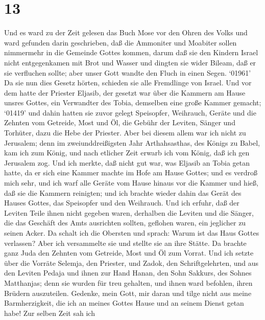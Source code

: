 \hypertarget{section-12}{%
\section{13}\label{section-12}}

 Und es ward zu der Zeit gelesen das Buch Mose vor den Ohren
des Volks und ward gefunden darin geschrieben, daß die Ammoniter und
Moabiter sollen nimmermehr in die Gemeinde Gottes kommen, 
darum daß sie den Kindern Israel nicht entgegenkamen mit Brot und Wasser
und dingten sie wider Bileam, daß er sie verfluchen sollte; aber unser
Gott wandte den Fluch in einen Segen.  `01961' Da sie nun
dies Gesetz hörten, schieden sie alle Fremdlinge von Israel.
 Und vor dem hatte der Priester Eljasib, der gesetzt war
über die Kammern am Hause unsres Gottes, ein Verwandter des Tobia,
demselben eine große Kammer gemacht;  `01419' und dahin
hatten sie zuvor gelegt Speisopfer, Weihrauch, Geräte und die Zehnten
vom Getreide, Most und Öl, die Gebühr der Leviten, Sänger und Torhüter,
dazu die Hebe der Priester.  Aber bei diesem allem war ich
nicht zu Jerusalem; denn im zweiunddreißigsten Jahr Arthahsasthas, des
Königs zu Babel, kam ich zum König, und nach etlicher Zeit erwarb ich
vom König,  daß ich gen Jerusalem zog. Und ich merkte, daß
nicht gut war, was Eljasib an Tobia getan hatte, da er sich eine Kammer
machte im Hofe am Hause Gottes;  und es verdroß mich sehr,
und ich warf alle Geräte vom Hause hinaus vor die Kammer 
und hieß, daß sie die Kammern reinigten; und ich brachte wieder dahin
das Gerät des Hauses Gottes, das Speisopfer und den Weihrauch.
 Und ich erfuhr, daß der Leviten Teile ihnen nicht gegeben
waren, derhalben die Leviten und die Sänger, die das Geschäft des Amts
ausrichten sollten, geflohen waren, ein jeglicher zu seinen Acker.
 Da schalt ich die Obersten und sprach: Warum ist das Haus
Gottes verlassen? Aber ich versammelte sie und stellte sie an ihre
Stätte.  Da brachte ganz Juda den Zehnten vom Getreide,
Most und Öl zum Vorrat.  Und ich setzte über die Vorräte
Selemja, den Priester, und Zadok, den Schriftgelehrten, und aus den
Leviten Pedaja und ihnen zur Hand Hanan, den Sohn Sakkurs, des Sohnes
Matthanjas; denn sie wurden für treu gehalten, und ihnen ward befohlen,
ihren Brüdern auszuteilen.  Gedenke, mein Gott, mir daran
und tilge nicht aus meine Barmherzigkeit, die ich an meines Gottes Hause
und an seinem Dienst getan habe!  Zur selben Zeit sah ich
